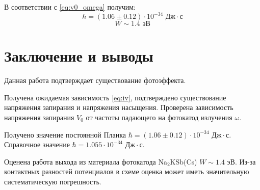\documentclass[a4paper, 12pt]{article} %
\begin{document}
	В соответствии с \eqref{eq:v0_omega} получим:
	$$\hbar = (1.06 \pm 0.12)\cdot 10^{-34} \text{ Дж}\cdot\text{с}$$
	$$W \sim 1.4 \text{ эВ}$$
	
	\section{Заключение и выводы}
	
	Данная работа подтверждает существование фотоэффекта.
	
	Получена ожидаемая зависимость \eqref{eq:iv}, подтверждено существование напряжения запирания и напряжения насыщения. Проверена зависимость напряжения запирания $V_0$ от частоты падающего на фотокатод излучения $\omega$.
	
	Получено значение постоянной Планка $\hbar = (1.06 \pm 0.12)\cdot 10^{-34} \text{ Дж}\cdot\text{с}$. Справочное значение $\hbar = 1.055\cdot 10^{-34} \text{ Дж}\cdot\text{с}$.

	Оценена работа выхода из материала фотокатода Na$_2$KSb(Cs) $W \sim 1.4 \text{ эВ}$. Из-за контактных разностей потенциалов в схеме оценка может иметь значительную систематическую погрешность.
	
		
\end{document}
